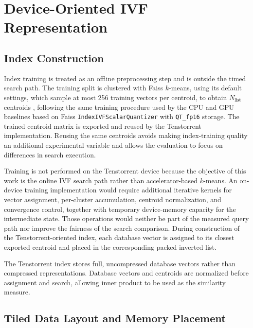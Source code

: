 \section{Device-Oriented IVF Representation}
\label{sec:device-oriented-ivf}

\subsection{Index Construction}
\label{subsec:index-construction}

Index training is treated as an offline preprocessing step and is outside the timed search path. The training split is clustered with Faiss \(k\)-means, using its default settings, which sample at most 256 training vectors per centroid, to obtain \(N_{\mathrm{list}}\) centroids \cite{faiss}, following the same training procedure used by the CPU and GPU baselines based on Faiss \texttt{IndexIVFScalarQuantizer} with \texttt{QT\_fp16} storage. The trained centroid matrix is exported and reused by the Tenstorrent implementation. Reusing the same centroids avoids making index-training quality an additional experimental variable and allows the evaluation to focus on differences in search execution.

Training is not performed on the Tenstorrent device because the objective of this work is the online IVF search path rather than accelerator-based \(k\)-means. An on-device training implementation would require additional iterative kernels for vector assignment, per-cluster accumulation, centroid normalization, and convergence control, together with temporary device-memory capacity for the intermediate state. Those operations would neither be part of the measured query path nor improve the fairness of the search comparison. During construction of the Tenstorrent-oriented index, each database vector is assigned to its closest exported centroid and placed in the corresponding packed inverted list.

The Tenstorrent index stores full, uncompressed database vectors rather than compressed representations. Database vectors and centroids are normalized before assignment and search, allowing inner product to be used as the similarity measure.

\subsection{Tiled Data Layout and Memory Placement}
\label{subsec:tiled-list-layout}


